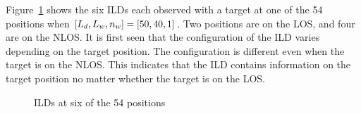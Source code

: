 Figure~\ref{fig:ILDs} shows the six ILDs each observed with a target at one of the 54 positions when $\left [ L_d, L_w, n_w \right ] = \left [ 50, 40, 1 \right ]$.  Two positions are on the LOS, and four are on the NLOS.  It is first seen that the configuration of the ILD varies depending on the target position.  The configuration is different even when the target is on the NLOS.  This indicates that the ILD contains information on the target position no matter whether the target is on the LOS.  

\begin{figure}[ht]
	\centering
	\caption{ILDs at six of the 54 positions}
	\label{fig:ILDs}
\end{figure}

